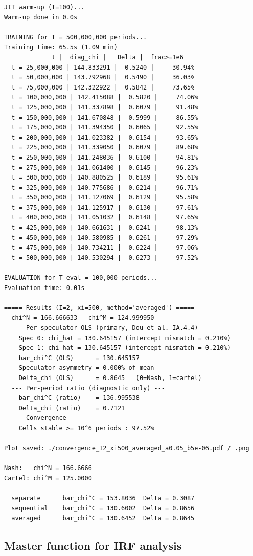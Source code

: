 \begin{lstlisting}[style=outputstyle]
JIT warm-up (T=100)...
Warm-up done in 0.0s

TRAINING for T = 500,000,000 periods...
Training time: 65.5s (1.09 min)
             t |  diag_chi |   Delta |  frac>=1e6
  t = 25,000,000 | 144.833291 |  0.5240 |     30.94%
  t = 50,000,000 | 143.792968 |  0.5490 |     36.03%
  t = 75,000,000 | 142.322922 |  0.5842 |     73.65%
  t = 100,000,000 | 142.415088 |  0.5820 |     74.06%
  t = 125,000,000 | 141.337898 |  0.6079 |     91.48%
  t = 150,000,000 | 141.670848 |  0.5999 |     86.55%
  t = 175,000,000 | 141.394350 |  0.6065 |     92.55%
  t = 200,000,000 | 141.023382 |  0.6154 |     93.65%
  t = 225,000,000 | 141.339050 |  0.6079 |     89.68%
  t = 250,000,000 | 141.248036 |  0.6100 |     94.81%
  t = 275,000,000 | 141.061400 |  0.6145 |     96.23%
  t = 300,000,000 | 140.880525 |  0.6189 |     95.61%
  t = 325,000,000 | 140.775686 |  0.6214 |     96.71%
  t = 350,000,000 | 141.127069 |  0.6129 |     95.58%
  t = 375,000,000 | 141.125917 |  0.6130 |     97.61%
  t = 400,000,000 | 141.051032 |  0.6148 |     97.65%
  t = 425,000,000 | 140.661631 |  0.6241 |     98.13%
  t = 450,000,000 | 140.580985 |  0.6261 |     97.29%
  t = 475,000,000 | 140.734211 |  0.6224 |     97.06%
  t = 500,000,000 | 140.530294 |  0.6273 |     97.52%

EVALUATION for T_eval = 100,000 periods...
Evaluation time: 0.01s

===== Results (I=2, xi=500, method='averaged') =====
  chi^N = 166.666633   chi^M = 124.999950
  --- Per-speculator OLS (primary, Dou et al. IA.4.4) ---
    Spec 0: chi_hat = 130.645157 (intercept mismatch = 0.210%)
    Spec 1: chi_hat = 130.645157 (intercept mismatch = 0.210%)
    bar_chi^C (OLS)      = 130.645157
    Speculator asymmetry = 0.000% of mean
    Delta_chi (OLS)      = 0.8645   (0=Nash, 1=cartel)
  --- Per-period ratio (diagnostic only) ---
    bar_chi^C (ratio)    = 136.995538
    Delta_chi (ratio)    = 0.7121
  --- Convergence ---
    Cells stable >= 10^6 periods : 97.52%

Plot saved: ./convergence_I2_xi500_averaged_a0.05_b5e-06.pdf / .png

Nash:   chi^N = 166.6666
Cartel: chi^M = 125.0000

  separate      bar_chi^C = 153.8036  Delta = 0.3087
  sequential    bar_chi^C = 130.6002  Delta = 0.8656
  averaged      bar_chi^C = 130.6452  Delta = 0.8645
\end{lstlisting}

\subsection{Master function for IRF analysis}

